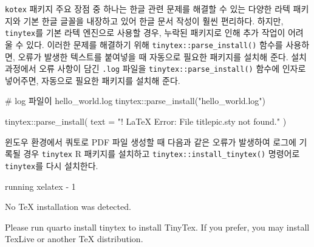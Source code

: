 \documentclass[
  letterpaper,
]{book}
\newenvironment{Shaded}{\begin{snugshade}}{\end{snugshade}}
\newcommand{\AttributeTok}[1]{\textcolor[rgb]{0.40,0.45,0.13}{#1}}
\newcommand{\CommentTok}[1]{\textcolor[rgb]{0.37,0.37,0.37}{#1}}
\newcommand{\ExtensionTok}[1]{\textcolor[rgb]{0.00,0.23,0.31}{#1}}
\newcommand{\FunctionTok}[1]{\textcolor[rgb]{0.28,0.35,0.67}{#1}}
\newcommand{\NormalTok}[1]{\textcolor[rgb]{0.00,0.23,0.31}{#1}}
\newcommand{\SpecialCharTok}[1]{\textcolor[rgb]{0.37,0.37,0.37}{#1}}
\newcommand{\StringTok}[1]{\textcolor[rgb]{0.13,0.47,0.30}{#1}}
\begin{document}
\texttt{kotex} 패키지 주요 장점 중 하나는 한글 관련 문제를 해결할 수
있는 다양한 라텍 패키지와 기본 한글 글꼴을 내장하고 있어 한글 문서
작성이 훨씬 편리하다. 하지만, \texttt{tinytex}를 기본 라텍 엔진으로
사용할 경우, 누락된 패키지로 인해 추가 작업이 어려울 수 있다. 이러한
문제를 해결하기 위해 \texttt{tinytex::parse\_install()} 함수를 사용하면,
오류가 발생한 텍스트를 붙여넣을 때 자동으로 필요한 패키지를 설치해 준다.
설치과정에서 오류 사항이 담긴 \texttt{.log} 파일을
\texttt{tinytex::parse\_install()} 함수에 인자로 넣어주면, 자동으로
필요한 패키지를 설치해 준다.

\begin{Shaded}
\begin{Highlighting}[]
\CommentTok{\# log 파일이 hello\_world.log}
\NormalTok{tinytex}\SpecialCharTok{::}\FunctionTok{parse\_install}\NormalTok{(}\StringTok{"hello\_world.log"}\NormalTok{)}

\NormalTok{tinytex}\SpecialCharTok{::}\FunctionTok{parse\_install}\NormalTok{(}
  \AttributeTok{text =} \StringTok{"! LaTeX Error: File \textasciigrave{}titlepic.sty\textquotesingle{} not found."}
\NormalTok{)}
\end{Highlighting}
\end{Shaded}

\begin{tcolorbox}[enhanced jigsaw, opacityback=0, opacitybacktitle=0.6, colback=white, rightrule=.15mm, coltitle=black, colframe=quarto-callout-note-color-frame, colbacktitle=quarto-callout-note-color!10!white, bottomrule=.15mm, bottomtitle=1mm, breakable, title=\textcolor{quarto-callout-note-color}{\faInfo}\hspace{0.5em}{\texttt{tinytex} 설치}, titlerule=0mm, leftrule=.75mm, toptitle=1mm, left=2mm, arc=.35mm, toprule=.15mm]

윈도우 환경에서 쿼토로 PDF 파일 생성할 때 다음과 같은 오류가 발생하여
로그에 기록될 경우 \texttt{tinytex} R 패키지를 설치하고
\texttt{tinytex::install\_tinytex()} 명령어로 \texttt{tinytex}를 다시
설치한다.

\begin{Shaded}
\begin{Highlighting}[]
\ExtensionTok{running}\NormalTok{ xelatex }\AttributeTok{{-}}\NormalTok{ 1}

\ExtensionTok{No}\NormalTok{ TeX installation was detected.}

\ExtensionTok{Please}\NormalTok{ run }\StringTok{\textquotesingle{}quarto install tinytex\textquotesingle{}}\NormalTok{ to install TinyTex.}
\ExtensionTok{If}\NormalTok{ you prefer, you may install TexLive or another TeX distribution.}
\end{Highlighting}
\end{Shaded}

\end{tcolorbox}
\end{document}
